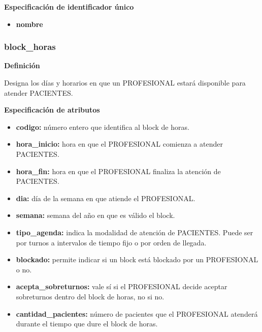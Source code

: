 \documentclass[a4paper,11pt]{article}
\begin{document}
\textbf{Especificación de identificador único}

\begin{itemize}

     \item \textbf{nombre}

\end{itemize}

\subsubsection{\textbf{block\_horas}}

\textbf{Definición}

Designa los días y horarios en que un PROFESIONAL estará disponible para atender 
PACIENTES.

\textbf{Especificación de atributos}

\begin{itemize}

     \item \textbf{codigo:} número entero que identifica al block de horas.

     \item \textbf{hora\_inicio:} hora en que el PROFESIONAL comienza a atender PACIENTES.

     \item \textbf{hora\_fin:} hora en que el PROFESIONAL finaliza la atención de PACIENTES.

     \item \textbf{dia:} día de la semana en que atiende el PROFESIONAL.

     \item \textbf{semana:} semana del año en que es válido el block.

     \item \textbf{tipo\_agenda:} indica la modalidad de atención de PACIENTES. Puede ser por 
     turnos a intervalos de tiempo fijo o por orden de llegada.

     \item \textbf{blockado:} permite indicar si un block está blockado por un PROFESIONAL o 
     no.

     \item \textbf{acepta\_sobreturnos:} vale sí si el PROFESIONAL decide aceptar sobreturnos dentro 
     del block de horas, no si no.

     \item \textbf{cantidad\_pacientes:} número de pacientes que el PROFESIONAL atenderá durante 
     el tiempo que dure el block de horas.

\end{itemize}
\end{document}

